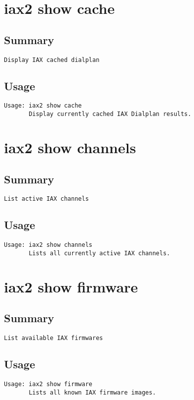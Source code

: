 \section{iax2 show cache}
\subsection{Summary}
\begin{verbatim}
Display IAX cached dialplan
\end{verbatim}
\subsection{Usage}
\begin{verbatim}
Usage: iax2 show cache
       Display currently cached IAX Dialplan results.

\end{verbatim}


\section{iax2 show channels}
\subsection{Summary}
\begin{verbatim}
List active IAX channels
\end{verbatim}
\subsection{Usage}
\begin{verbatim}
Usage: iax2 show channels
       Lists all currently active IAX channels.

\end{verbatim}


\section{iax2 show firmware}
\subsection{Summary}
\begin{verbatim}
List available IAX firmwares
\end{verbatim}
\subsection{Usage}
\begin{verbatim}
Usage: iax2 show firmware
       Lists all known IAX firmware images.

\end{verbatim}


